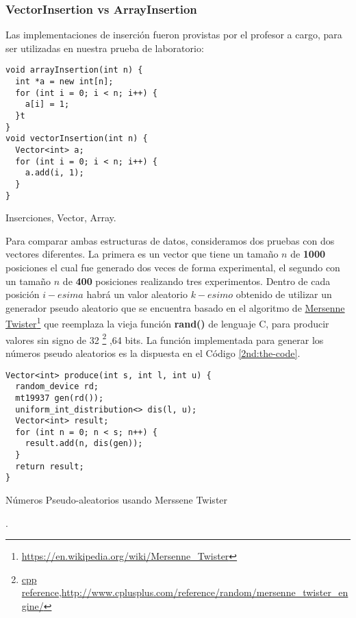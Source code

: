 \documentclass[paper=a4, fontsize=12pt]{article} 		%
\newcommand\fnurl[2]{%
\href{#2}{#1}\footnote{\url{#2}}%
}
\numberwithin{equation}{section}						%
\numberwithin{table}{section} 							%
\begin{document}
\subsubsection{VectorInsertion vs ArrayInsertion}
Las implementaciones de inserción fueron provistas por el profesor a cargo, para ser utilizadas en nuestra prueba de laboratorio: 	
\begin{listing}[H]
	\begin{verbatim}
void arrayInsertion(int n) {
  int *a = new int[n];
  for (int i = 0; i < n; i++) {
    a[i] = 1;
  }t
}
void vectorInsertion(int n) {
  Vector<int> a;
  for (int i = 0; i < n; i++) {
    a.add(i, 1);
  }
}
\end{verbatim}
\caption{Inserciones, Vector, Array.}
    \label{lst:the-code}
\end{listing}
Para comparar ambas estructuras de datos, consideramos dos pruebas con dos vectores diferentes. La primera es un vector que tiene un tamaño $n$ de \textbf{1000} posiciones el cual fue generado dos veces de forma experimental, el segundo con un tamaño $n$ de \textbf{400} posiciones realizando tres experimentos. Dentro de cada posición $i-esima$ habrá un valor aleatorio $k-esimo$ obtenido de utilizar un generador pseudo aleatorio que se encuentra basado en el algoritmo de \fnurl{Mersenne Twister}{https://en.wikipedia.org/wiki/Mersenne_Twister} que reemplaza la vieja función \textbf{rand()} de lenguaje C, para producir valores sin signo de 32\fnurl{}{cpp reference,http://www.cplusplus.com/reference/random/mersenne_twister_engine/},64 bits. La función implementada para generar los números pseudo aleatorios es la dispuesta en el Código \ref{2nd:the-code}.
\begin{listing}[H]
	\begin{verbatim}
Vector<int> produce(int s, int l, int u) {
  random_device rd;
  mt19937 gen(rd());
  uniform_int_distribution<> dis(l, u);
  Vector<int> result;
  for (int n = 0; n < s; n++) {
    result.add(n, dis(gen));
  }
  return result;
}
\end{verbatim}
\caption{Números Pseudo-aleatorios usando Merssene Twister}.
    \label{2nd:the-code}
\end{listing}
\end{document}
